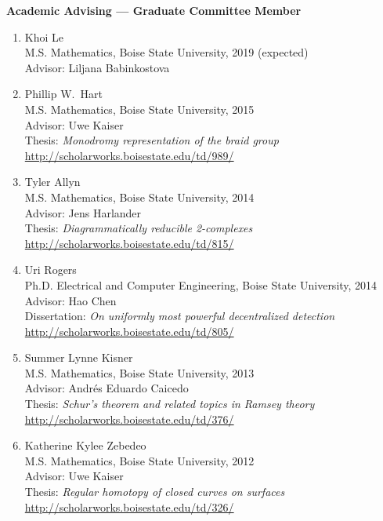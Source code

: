 \documentclass[12pt]{article}
\begin{document}
\textbf{Academic Advising --- Graduate Committee Member}
\begin{enumerate}

\item Khoi Le \\
M.S. Mathematics, Boise State University, 2019 (expected) \\
Advisor: Liljana Babinkostova

\item Phillip W.\ Hart \\
M.S. Mathematics, Boise State University, 2015 \\
Advisor: Uwe Kaiser \\
Thesis: \emph{Monodromy representation of the braid group} \\
\url{http://scholarworks.boisestate.edu/td/989/}

\item Tyler Allyn \\
M.S. Mathematics, Boise State University, 2014 \\
Advisor: Jens Harlander \\
Thesis: \emph{Diagrammatically reducible 2-complexes} \\
\url{http://scholarworks.boisestate.edu/td/815/}

\item Uri Rogers \\
Ph.D. Electrical and Computer Engineering, Boise State University, 2014 \\
Advisor: Hao Chen \\
Dissertation: \emph{On uniformly most powerful decentralized detection} \\
\url{http://scholarworks.boisestate.edu/td/805/}

\item Summer Lynne Kisner \\
M.S. Mathematics, Boise State University, 2013 \\
Advisor: Andr\'es Eduardo Caicedo \\
Thesis: \emph{Schur's theorem and related topics in Ramsey theory} \\
\url{http://scholarworks.boisestate.edu/td/376/}

\item Katherine Kylee Zebedeo \\
M.S. Mathematics, Boise State University, 2012 \\
Advisor: Uwe Kaiser \\
Thesis: \emph{Regular homotopy of closed curves on surfaces} \\
\url{http://scholarworks.boisestate.edu/td/326/}
\end{enumerate}
\end{document}
